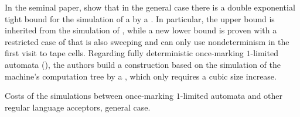 In the seminal paper, \citeauthor{PigPri23a} show that in the general case there is a double exponential tight bound for the simulation of a \OMOLA by a \ODFA \cite{PigPri23a}.
In particular, the upper bound is inherited from the simulation of \OLA, while a new lower bound is proven with a restricted case of \OMOLA that is also sweeping and can only use nondeterminism in the first visit to tape cells.
Regarding fully deterministic once-marking $1$-limited automata (\OMODLA), the authors build a construction based on the simulation of the machine's computation tree by a \TDFA, which only requires a cubic size increase.

\begin{table}
	\centering
	\caption{Costs of the simulations between once-marking $1$-limited automata and other regular language acceptors, general case.}
	\label{tab:sims-om-general-oncemarking}
\end{table}

